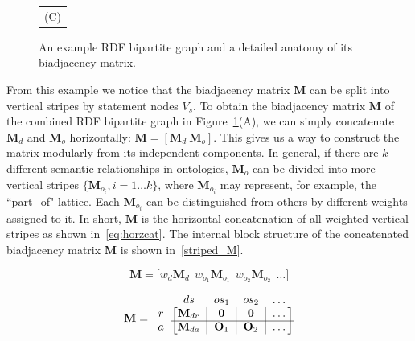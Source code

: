 \begin{figure}[h!t]
\begin{center}
\begin{tabular}{c  c}
\multicolumn{2}{c}{(C)}
\end{tabular}
\end{center}
\caption[An example RDF bipartite graph and its biadjacency matrix]{\label{fig:biadjacency-matrices} An example RDF bipartite graph and a detailed anatomy of its biadjacency matrix.}
\end{figure}
\clearpage

From this example we notice that the biadjacency matrix $\mathbf{M}$ can be split into vertical stripes by statement nodes $V_s$. To obtain the biadjacency matrix $\mathbf{M}$ of the combined RDF bipartite graph in Figure~\ref{fig:biadjacency-matrices}(A), we can simply concatenate $\mathbf{M}_d$ and $\mathbf{M}_o$ horizontally: $\mathbf{M}=\left[\mathbf{M}_d~\mathbf{M}_o\right]$. This gives us a way to construct the matrix modularly from its independent components. In general, if there are $k$ different semantic relationships in ontologies, $\mathbf{M}_o$ can be divided into more vertical stripes $\{\mathbf{M}_{o_i}, i=1\dots k\}$, where $\mathbf{M}_{o_i}$ may represent, for example, the ``part\_of" lattice. Each $\mathbf{M}_{o_i}$ can be distinguished from others by different weights assigned to it. In short, $\mathbf{M}$ is the horizontal concatenation of all weighted vertical stripes as shown in~\ref{eq:horzcat}. The internal block structure of the concatenated biadjacency matrix $\mathbf{M}$ is shown in~\ref{striped_M}.

\begin{equation}\label{eq:horzcat}
\mathbf{M} = \bigg[w_d\mathbf{M}_d ~~ w_{o_1}\mathbf{M}_{o_1} ~~ w_{o_2}\mathbf{M}_{o_2} ~~ \dots\bigg]
\end{equation}

\begin{equation}
\label{striped_M}
\mathbf{M}=\begin{blockarray}{ccccc}
                ~ & ds & os_1 & os_2 & \dots \\
            \begin{block}{c[c|c|c|c]}
                r   &   \mathbf{M}_{dr}  &   \mathbf{0}   &   \mathbf{0}   &   \dots \\
                \cline{2-5}
                a   &   \mathbf{M}_{da}  &   \mathbf{O}_1 &   \mathbf{O}_2 &   \dots \\
            \end{block}
        \end{blockarray}
\end{equation}


